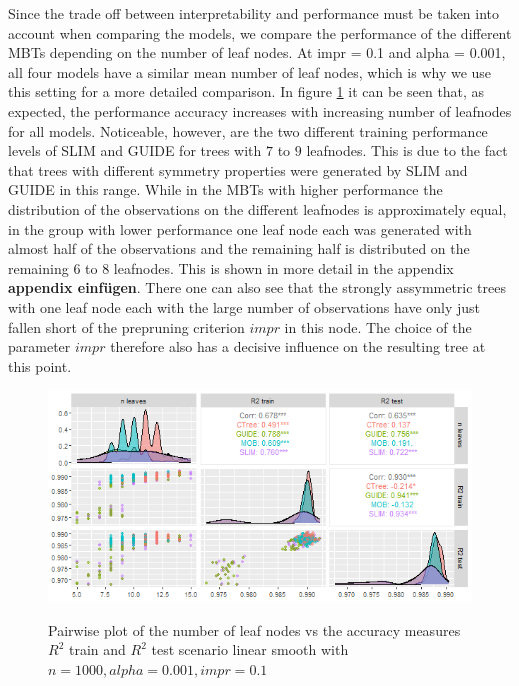 Since the trade off between interpretability and performance must be taken into account when comparing the models, we compare the performance of the different MBTs depending on the number of leaf nodes. 
At impr = 0.1 and alpha = 0.001, all four models have a similar mean number of leaf nodes, which is why we use this setting for a more detailed comparison.
In figure \ref{fig:ls_1000_standalone_r2_nleaves} it can be seen that, as expected, the performance accuracy increases with increasing number of leafnodes for all models. Noticeable, however, are the two different training performance levels of SLIM and GUIDE for trees with $7$ to $9$ leafnodes. This is due to the fact that trees with different symmetry properties were generated by SLIM and GUIDE in this range. While in the MBTs with higher performance the distribution of the observations on the different leafnodes is approximately equal, in the group with lower performance one leaf node each was generated with almost half of the observations and the remaining half is distributed on the remaining $6$ to $8$ leafnodes. This is shown in more detail in the appendix \textbf{appendix einfügen}. There one can also see that the strongly assymmetric trees with one leaf node each with the large number of observations have only just fallen short of the prepruning criterion $impr$ in this node. The choice of the parameter $impr$ therefore also has a decisive influence on the resulting tree at this point.


\begin{figure} 
\caption{Pairwise plot of the number of leaf nodes vs the accuracy measures $R^2$ train and $R^2$ test scenario linear smooth with $n=1000, alpha = 0.001, impr = 0.1$}
    \includegraphics[width=16cm]{Figures/simulations/batchtools/basic_scenarios/linear_smooth/ls_1000_standalone_r2_nleaves.png}
    \label{fig:ls_1000_standalone_r2_nleaves}
\end{figure} 


